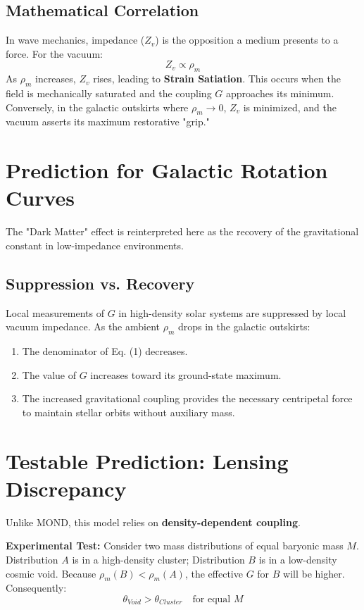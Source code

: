 \documentclass[12pt,a4paper]{article}
\begin{document}
\subsection{Mathematical Correlation}
In wave mechanics, impedance ($Z_v$) is the opposition a medium presents to a force. For the vacuum:
\begin{equation}
Z_v \propto \rho_m
\end{equation}
As $\rho_m$ increases, $Z_v$ rises, leading to \textbf{Strain Satiation}. This occurs when the field is mechanically saturated and the coupling $G$ approaches its minimum. Conversely, in the galactic outskirts where $\rho_m \to 0$, $Z_v$ is minimized, and the vacuum asserts its maximum restorative "grip."

\section{Prediction for Galactic Rotation Curves}
The "Dark Matter" effect is reinterpreted here as the recovery of the gravitational constant in low-impedance environments.

\subsection{Suppression vs. Recovery}
Local measurements of $G$ in high-density solar systems are suppressed by local vacuum impedance. As the ambient $\rho_m$ drops in the galactic outskirts:
\begin{enumerate}
    \item The denominator of Eq. (1) decreases.
    \item The value of $G$ increases toward its ground-state maximum.
    \item The increased gravitational coupling provides the necessary centripetal force to maintain stellar orbits without auxiliary mass.
\end{enumerate}



\section{Testable Prediction: Lensing Discrepancy}
Unlike MOND, this model relies on \textbf{density-dependent coupling}. 

\textbf{Experimental Test:} Consider two mass distributions of equal baryonic mass $M$. Distribution $A$ is in a high-density cluster; Distribution $B$ is in a low-density cosmic void. Because $\rho_m(B) < \rho_m(A)$, the effective $G$ for $B$ will be higher. Consequently:
\begin{equation}
\theta_{Void} > \theta_{Cluster} \quad \text{for equal } M
\end{equation}
\end{document}
